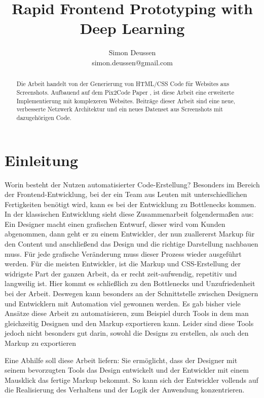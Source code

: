 \documentclass[pdftex,a4paper,halfparskip, article]{scrartcl}
\title{Rapid Frontend Prototyping with Deep Learning} %
\author{Simon Deussen \\ simon.deussen@gmail.com}	%
\begin{document}
\maketitle	

\begin{abstract}
Die Arbeit handelt von der Generierung von HTML/CSS Code für Websites aus Screenshots. Aufbauend auf dem Pix2Code Paper \cite{Beltramelli17}, ist diese Arbeit eine erweiterte Implementierung mit komplexeren Websites. Beiträge dieser Arbeit sind eine neue, verbesserte Netzwerk Architektur und ein neues Datenset aus Screenshots mit dazugehörigen Code.
\end{abstract}


\tableofcontents	%
\section{Einleitung} 

Worin besteht der Nutzen automatisierter Code-Erstellung? 
Besonders im Bereich der Frontend-Entwicklung, bei der ein Team aus Leuten mit unterschiedlichen Fertigkeiten benötigt wird, kann es bei der Entwicklung zu Bottlenecks kommen. In der klassischen Entwicklung sieht diese Zusammenarbeit folgendermaßen aus: \\
Ein Designer macht einen grafischen Entwurf, dieser wird vom Kunden abgenommen, dann geht er zu einem Entwickler, der nun zuallererst Markup für den Content und anschließend das Design und die richtige Darstellung nachbauen muss. Für jede grafische Veränderung muss dieser Prozess wieder ausgeführt werden. Für die meisten Entwickler, ist die Markup und CSS-Erstellung der widrigste Part der ganzen Arbeit, da er recht zeit-aufwendig, repetitiv und langweilig ist.
Hier kommt es schließlich zu den Bottlenecks und Unzufriedenheit bei der Arbeit. Deswegen kann besonders an der Schnittstelle zwischen Designern und Entwicklern mit Automation viel gewonnen werden. Es gab bisher viele Ansätze diese Arbeit zu automatisieren, zum Beispiel durch Tools in dem man gleichzeitig Designen und den Markup exportieren kann. Leider sind diese Tools jedoch nicht besonders gut darin, sowohl die Designs zu erstellen, als auch den Markup zu exportieren

Eine Abhilfe soll diese Arbeit liefern: Sie ermöglicht, dass der Designer mit seinem bevorzugten Tools das Design entwickelt und der Entwickler mit einem Mausklick das fertige Markup bekommt. So kann sich der Entwickler vollends auf die Realisierung des Verhaltens und der Logik der Anwendung konzentrieren. 
\end{document}
